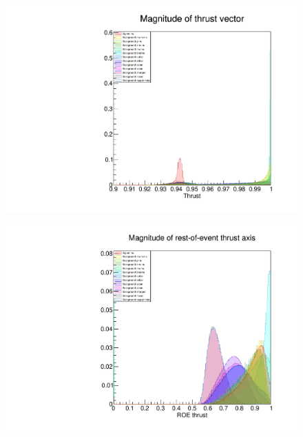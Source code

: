 \documentclass[12pt]{thesis}  %
\begin{document}
\begin{figure}[h]
\centering
\begin{minipage}{.5\textwidth}
  \centering
  \includegraphics[width=\linewidth]{images/tauMG-thrustSignal.pdf}
  \label{fig:test1}
\end{minipage}%
\begin{minipage}{.5\textwidth}
  \centering
  \includegraphics[width=\linewidth]{images/tauMG-thrustRoe.pdf}
  \label{fig:test2}
\end{minipage}
\end{figure}
\end{document}
